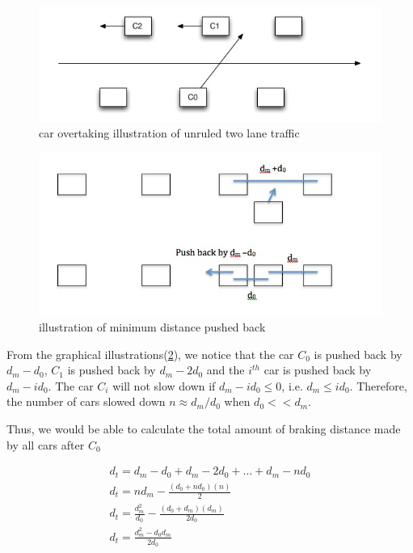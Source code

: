 \begin{figure}
\includegraphics[scale = 0.5]{plot/P1}
\caption{car overtaking illustration of unruled two lane traffic\label{safety1}}

\end{figure}

\begin{figure}
\includegraphics[scale = 0.5]{plot/P2}
\caption{illustration of minimum distance pushed back\label{safety2}}
\end{figure}

From the graphical illustrations(\ref{safety2}), we notice that the car $C_0$ is pushed back by $d_m-d_0$, $C_1$ is pushed back by $d_m-2d_0$ and the $i^{th}$ car is pushed back by $d_m-id_0$. The car $C_i$ will not slow down if $d_m-id_0\le 0$, i.e. $d_m \le id_0$. Therefore, the number of cars slowed down $n \approx d_m/d_0$ when $d_0 << d_m$. 

Thus, we would be able to calculate the total amount of braking distance made by all cars after $C_0$

\begin{align}
&d_t = d_m-d_0 + d_m-2d_0 + \dots + d_m - nd_0 & \\
&d_t = nd_m-\frac{(d_0+nd_0)(n)}{2}&\\
&d_t = \frac{d_m^2}{d_0}-\frac{(d_0+d_m)(d_m)}{2d_0}&\\
&d_t = \frac{d_m^2-d_0d_m}{2d_0}
\end{align}

